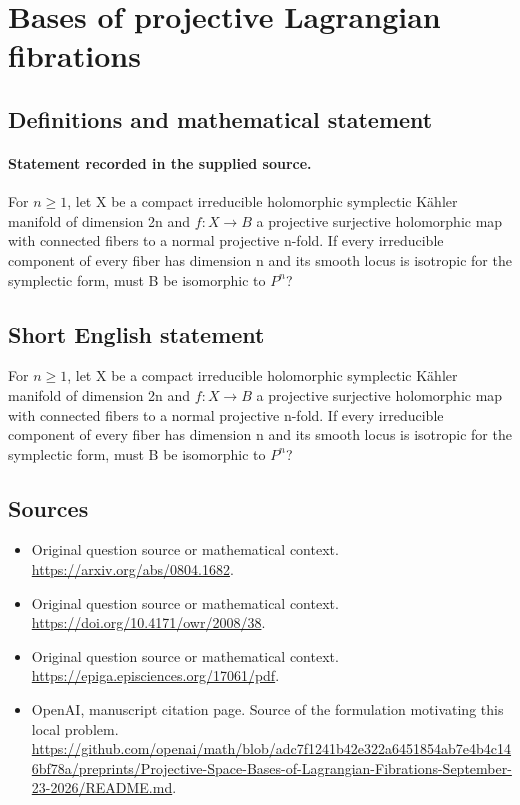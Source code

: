 \documentclass[11pt]{article}
\begin{document}
\section*{Bases of projective Lagrangian fibrations}\label{30007056}
\subsection{Definitions and mathematical statement}
\paragraph{Statement recorded in the supplied source.}
For $n\geq 1$, let X be a compact irreducible holomorphic symplectic Kähler manifold of dimension 2n and $f:X\to B$ a projective surjective holomorphic map with connected fibers to a normal projective n-fold. If every irreducible component of every fiber has dimension n and its smooth locus is isotropic for the symplectic form, must B be isomorphic to $P^n$?
\subsection{Short English statement}
For $n\geq 1$, let X be a compact irreducible holomorphic symplectic Kähler manifold of dimension 2n and $f:X\to B$ a projective surjective holomorphic map with connected fibers to a normal projective n-fold. If every irreducible component of every fiber has dimension n and its smooth locus is isotropic for the symplectic form, must B be isomorphic to $P^n$?
\subsection{Sources}
\begin{itemize}
\item[S1] Original question source or mathematical context.
\url{https://arxiv.org/abs/0804.1682}.
\item[S2] Original question source or mathematical context.
\url{https://doi.org/10.4171/owr/2008/38}.
\item[S3] Original question source or mathematical context.
\url{https://epiga.episciences.org/17061/pdf}.
\item[S4] OpenAI, manuscript citation page. Source of the formulation motivating this local problem.
\url{https://github.com/openai/math/blob/adc7f1241b42e322a6451854ab7e4b4c146bf78a/preprints/Projective-Space-Bases-of-Lagrangian-Fibrations-September-23-2026/README.md}.
\end{itemize}
\end{document}
